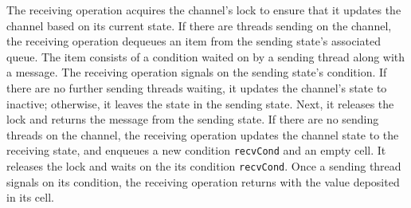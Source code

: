 \documentclass[10pt]{article}
\begin{document}
The receiving operation acquires the channel's lock
to ensure that it updates the channel based on
its current state.  If there are threads
sending on the channel, the receiving 
operation dequeues an item from the sending state's associated queue.  The item consists of a condition
waited on by a sending thread along with a message.
The receiving operation signals on the sending state's condition.
If there are no further sending threads waiting, it updates the channel's state to inactive; otherwise,
it leaves the state in the sending state.
Next, it releases the lock and returns the message from the sending state.
If there are no sending threads on the
channel, the receiving operation updates the channel state to the receiving state, and enqueues
a new condition \lstinline{recvCond} and an empty cell.  It releases the lock and waits on
the its condition \lstinline{recvCond}.  Once a sending thread signals on its condition,
the receiving operation returns with the value deposited in its cell.
\end{document}
